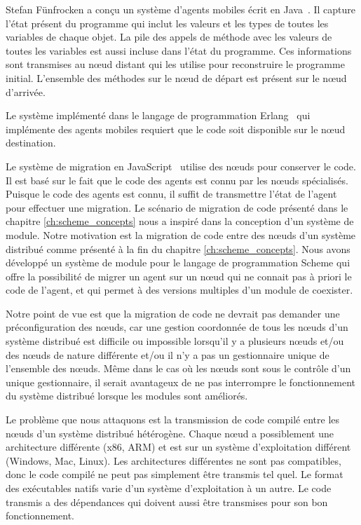 Stefan Fünfrocken a conçu un système d'agents mobiles écrit en
Java~\cite{And98transparentmigration}. Il capture l'état présent du programme
qui inclut les valeurs et les types de toutes les variables de chaque objet.
La pile des appels de méthode avec les valeurs de toutes les variables est
aussi incluse dans l'état du programme.  Ces informations sont transmises au
nœud distant qui les utilise pour reconstruire le programme initial.
L'ensemble des méthodes sur le nœud de départ est présent sur le nœud
d'arrivée.

Le système implémenté dans le langage de programmation
Erlang~\cite{M_mobileintelligent} qui implémente des agents mobiles requiert
que le code soit disponible sur le nœud destination.

Le système de migration en JavaScript~\cite{DEV2017transparentmigration}
utilise des nœuds pour conserver le code. Il est basé sur le fait que le code
des agents est connu par les nœuds spécialisés. Puisque le code des agents est
connu, il suffit de transmettre l'état de l'agent pour effectuer une migration.
Le scénario de migration de code présenté dans le chapitre
\ref{ch:scheme_concepts} nous a inspiré dans la conception d'un système de
module.
Notre motivation est la migration de code entre des nœuds d'un système
distribué comme présenté à la fin du chapitre \ref{ch:scheme_concepts}.  Nous
avons développé un système de module pour le langage de programmation Scheme
qui offre la possibilité de migrer un agent sur un nœud qui ne connait pas à
priori le code de l'agent, et qui permet à des versions multiples d'un module
de coexister.

Notre point de vue est que la migration de code ne devrait pas
demander une préconfiguration des nœuds, car une gestion coordonnée de
tous les nœuds d'un système distribué est difficile ou impossible
lorsqu'il y a plusieurs nœuds et/ou des nœuds de nature différente
et/ou il n'y a pas un gestionnaire unique de l'ensemble des nœuds.
Même dans le cas où les nœuds sont sous le contrôle d'un unique
gestionnaire, il serait avantageux de ne pas interrompre le
fonctionnement du système distribué lorsque les modules sont
améliorés.

Le problème que nous attaquons est la transmission de code compilé
entre les nœuds d'un système distribué hétérogène. Chaque nœud a
possiblement une architecture différente (x86, ARM) et est sur un
système d'exploitation différent (Windows, Mac, Linux).
Les architectures différentes ne sont pas compatibles, donc
le code compilé ne peut pas simplement être transmis tel quel.
Le format des exécutables natifs varie d'un système d'exploitation
à un autre. Le code transmis a des dépendances qui doivent aussi être
transmises pour son bon fonctionnement.


